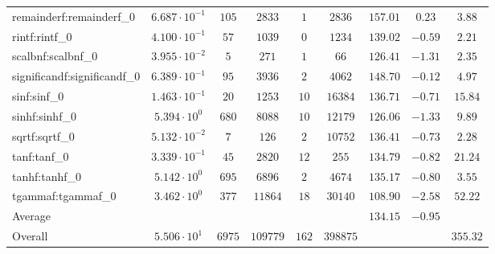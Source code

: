 \begin{tabular}{|l|c|c|c|c|c|c|c|c|}
remainderf:remainderf\_0     & $ 6.687 \cdot 10^{-1} $ & $ 105    $ & $ 2833   $ & $ 1   $ & $ 2836   $ & $ 157.01      $ & $ 0.23    $ & $ 3.88    $ \\
rintf:rintf\_0               & $ 4.100 \cdot 10^{-1} $ & $ 57     $ & $ 1039   $ & $ 0   $ & $ 1234   $ & $ 139.02      $ & $ -0.59   $ & $ 2.21    $ \\
scalbnf:scalbnf\_0           & $ 3.955 \cdot 10^{-2} $ & $ 5      $ & $ 271    $ & $ 1   $ & $ 66     $ & $ 126.41      $ & $ -1.31   $ & $ 2.35    $ \\
significandf:significandf\_0 & $ 6.389 \cdot 10^{-1} $ & $ 95     $ & $ 3936   $ & $ 2   $ & $ 4062   $ & $ 148.70      $ & $ -0.12   $ & $ 4.97    $ \\
sinf:sinf\_0                 & $ 1.463 \cdot 10^{-1} $ & $ 20     $ & $ 1253   $ & $ 10  $ & $ 16384  $ & $ 136.71      $ & $ -0.71   $ & $ 15.84   $ \\
sinhf:sinhf\_0               & $ 5.394 \cdot 10^{0}  $ & $ 680    $ & $ 8088   $ & $ 10  $ & $ 12179  $ & $ 126.06      $ & $ -1.33   $ & $ 9.89    $ \\
sqrtf:sqrtf\_0               & $ 5.132 \cdot 10^{-2} $ & $ 7      $ & $ 126    $ & $ 2   $ & $ 10752  $ & $ 136.41      $ & $ -0.73   $ & $ 2.28    $ \\
tanf:tanf\_0                 & $ 3.339 \cdot 10^{-1} $ & $ 45     $ & $ 2820   $ & $ 12  $ & $ 255    $ & $ 134.79      $ & $ -0.82   $ & $ 21.24   $ \\
tanhf:tanhf\_0               & $ 5.142 \cdot 10^{0}  $ & $ 695    $ & $ 6896   $ & $ 2   $ & $ 4674   $ & $ 135.17      $ & $ -0.80   $ & $ 3.55    $ \\
tgammaf:tgammaf\_0           & $ 3.462 \cdot 10^{0}  $ & $ 377    $ & $ 11864  $ & $ 18  $ & $ 30140  $ & $ 108.90      $ & $ -2.58   $ & $ 52.22   $ \\
\hline
Average                      & $                     $ & $        $ & $        $ & $     $ & $        $ & $ 134.15      $ & $ -0.95   $ & $         $ \\
\hline
Overall                      & $ 5.506 \cdot 10^{1}  $ & $ 6975   $ & $ 109779 $ & $ 162 $ & $ 398875 $ & $             $ & $         $ & $ 355.32  $ \\
\hline
\end{tabular}
